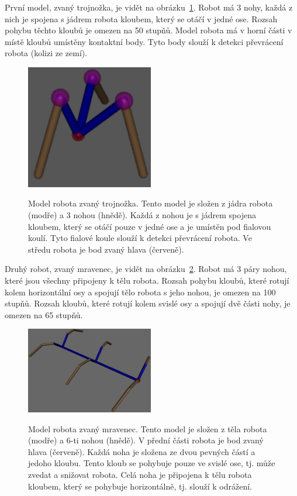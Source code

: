 První model, zvaný trojnožka, je vidět na obrázku~\ref{fig:trojnozka}.
Robot má 3 nohy, každá z nich je spojena s jádrem robota kloubem, který se otáčí v jedné ose.
Rozsah pohybu těchto kloubů je omezen na 50 stupňů.
Model robota má v horní části v místě kloubů umístěny kontaktní body.
Tyto body slouží k detekci převrácení robota (kolizi ze zemí).

\begin{figure}[h]
    \centering
    {\includegraphics[width=15em]{obrazky/trojnozka_detail.png}}
    \caption{
    Model robota zvaný trojnožka.
    Tento model je složen z jádra robota (modře) a 3 nohou (hnědě).
    Každá z nohou je s jádrem spojena kloubem, který se otáčí pouze v jedné ose a je umístěn pod fialovou koulí.
    Tyto fialové koule slouží k detekci převrácení robota.
    Ve středu robota je bod zvaný hlava (červeně).
    }
    \label{fig:trojnozka}
\end{figure}


Druhý robot, zvaný mravenec, je vidět na obrázku~\ref{fig:mravenec}.
Robot má 3 páry nohou, které jsou všechny připojeny k tělu robota.
Rozsah pohybu kloubů, které rotují kolem horizontální osy a spojují tělo robota s jeho nohou, je omezen na 100 stupňů.
Rozsah kloubů, které rotují kolem svislé osy a spojují dvě části nohy, je omezen na 65 stupňů.


\begin{figure}[h]
    \centering
    {\includegraphics[width=15em]{obrazky/mravenec_detail.png}}
    \caption{
    Model robota zvaný mravenec.
    Tento model je složen z těla robota (modře) a 6-ti nohou (hnědě).
    V přední části robota je bod zvaný hlava (červeně).
    Každá noha je složena ze dvou pevných částí a jedoho kloubu.
    Tento kloub se pohybuje pouze ve svislé ose, tj. může zvedat a snižovat robota.
    Celá noha je připojena k tělu robota kloubem, který se pohybuje horizontálně, tj. slouží k odrážení.
    }
    \label{fig:mravenec}
\end{figure}

